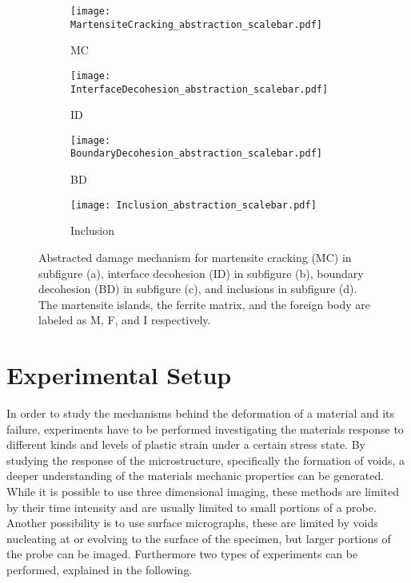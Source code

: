 \begin{figure}[H]
\begin{subfigure}{.25\textwidth}
\centering
  \texttt{[image: MartensiteCracking\_abstraction\_scalebar.pdf]}
  \caption{MC}
  \label{fig:MC}
\end{subfigure}%
\begin{subfigure}{.25\textwidth}
\centering
  \texttt{[image: InterfaceDecohesion\_abstraction\_scalebar.pdf]}
  \caption{ID}
  \label{fig:Interface_scalebar}
\end{subfigure}%
\centering
\begin{subfigure}{.25\textwidth}
\centering
  \texttt{[image: BoundaryDecohesion\_abstraction\_scalebar.pdf]}
  \caption{BD}
  \label{fig:Inclusion_scalebar}
\end{subfigure}%
\centering
\begin{subfigure}{.25\textwidth}
\centering
  \texttt{[image: Inclusion\_abstraction\_scalebar.pdf]}
  \caption{Inclusion}
  \label{fig:Inclusion_scalebar}
\end{subfigure}%
\caption{Abstracted damage mechanism for martensite cracking (MC) in subfigure (a), interface decohesion (ID) in subfigure (b), boundary decohesion (BD) in subfigure (c),  and inclusions in subfigure (d). The martensite islands, the ferrite matrix, and the foreign body are labeled as M, F, and I respectively.}
\label{fig:DamageCategories_abstraction}
\end{figure}

\section{Experimental Setup}

In order to study the mechanisms behind the deformation of a material and its failure, experiments have to be performed investigating the materials response to different kinds and levels of plastic strain under a certain stress state. By studying the response of the microstructure, specifically the formation of voids, a deeper understanding of the materials mechanic properties can be generated. While it is possible to use three dimensional imaging, these methods are limited by their time intensity and are usually limited to small portions of a probe. Another possibility is to use surface micrographs, these are limited by voids nucleating at or evolving to the surface of the specimen, but larger portions of the probe can be imaged. Furthermore two types of experiments can be performed, explained in the following. \\

